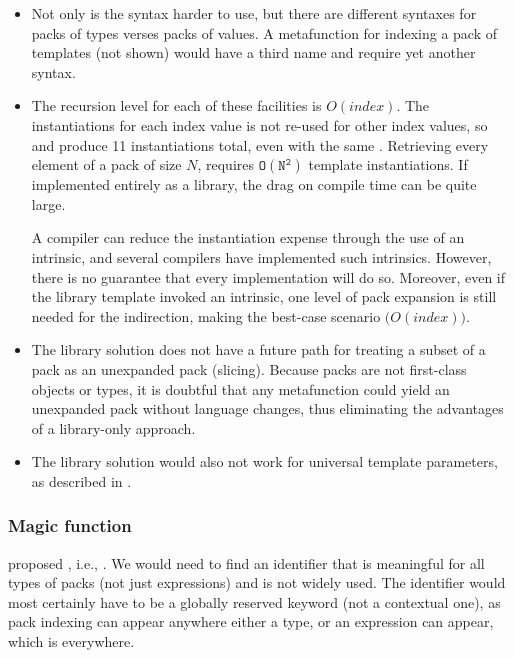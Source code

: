 \documentclass{wg21}
\begin{document}
\begin{itemize}
\item Not only is the syntax harder to use, but there are different syntaxes
  for packs of types verses packs of values. A metafunction for indexing a pack
  of templates (not shown) would have a third name and require yet another
  syntax.
\item The recursion level for each of these facilities is
  $O(index)$. The instantiations for each index value is not re-used for
  other index values, so  and
   produce 11 instantiations total, even with the
  same .  Retrieving every element of a pack of size $N$,
  requires $\mathtt{O(N^2)}$ template instantiations.  If implemented entirely as
  a library, the drag on compile time can be quite large.

  A compiler can reduce the instantiation expense through the use of an
  intrinsic, and several compilers have implemented such intrinsics.  However,
  there is no guarantee that every implementation will do so.  Moreover, even
  if the library template invoked an intrinsic, one level of pack expansion is
  still needed for the indirection, making the best-case scenario
  $\mathtt(O(index))$.
\item The library solution does not have a future path for
  treating a subset of a pack as an unexpanded pack (slicing). Because packs
  are not first-class objects or types, it is doubtful that any metafunction
  could yield an unexpanded pack without language changes, thus eliminating the
  advantages of a library-only approach.
\item The library solution would also not work for universal template
  parameters, as described in .
\end{itemize}

\subsubsection{Magic function}

 proposed , i.e., .
We would need to find an identifier that is meaningful for all types of packs (not just expressions) and is not widely used.
The identifier would most certainly have to be a globally reserved keyword (not a contextual one), as pack indexing can appear anywhere either a type, or an expression can appear, which is everywhere.
\end{document}
